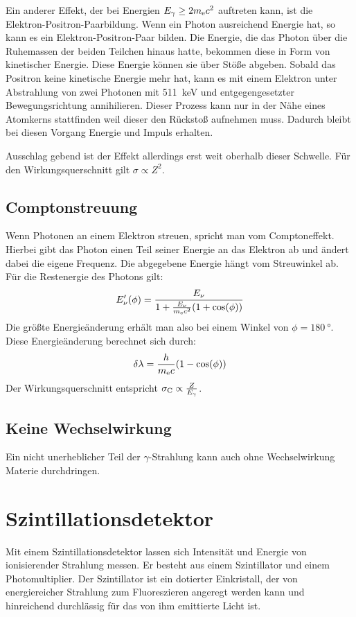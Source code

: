 \documentclass[11pt, ngerman, fleqn, DIV=15, headinclude, BCOR=2cm]{scrreprt}
\begin{document}
Ein anderer Effekt, der bei Energien $E_\gamma \ge 2m_\text ec^2$ auftreten
kann, ist die Elektron-Positron-Paarbildung. Wenn ein Photon ausreichend
Energie hat, so kann es ein Elektron-Positron-Paar bilden. Die Energie, die das
Photon über die Ruhemassen der beiden Teilchen hinaus hatte, bekommen diese in
Form von kinetischer Energie. Diese Energie können sie über Stöße abgeben.
Sobald das Positron keine kinetische Energie mehr hat, kann es mit einem
Elektron unter Abstrahlung von zwei Photonen mit \SI{511}{\kilo\electronvolt}
und entgegengesetzter Bewegungsrichtung annihilieren. Dieser Prozess kann nur in der Nähe eines Atomkerns stattfinden weil dieser
den Rückstoß aufnehmen muss.
Dadurch bleibt bei diesen Vorgang Energie und Impuls erhalten.

Ausschlag gebend ist der Effekt allerdings erst weit oberhalb dieser Schwelle.
Für den Wirkungsquerschnitt gilt $\sigma \propto Z^2$.

\subsection{Comptonstreuung}
Wenn Photonen an einem Elektron streuen, spricht man vom Comptoneffekt. 
Hierbei gibt das Photon einen Teil seiner Energie an das Elektron ab und ändert dabei
die eigene Frequenz.
Die abgegebene Energie hängt vom Streuwinkel ab.
Für die Restenergie des Photons gilt:
\[
    E_\nu'(\phi) = \frac{E_\nu}{1+\frac{E_\nu}{m_\text ec^2}(1+\cos(\phi))}
\]
Die größte Energieänderung erhält man also bei einem Winkel von
$\phi=\SI{180}{\degree}$.
Diese Energieänderung berechnet sich durch:
\[
    \delta\lambda = \frac{h}{m_\text ec}(1-\cos(\phi))
\]
Der Wirkungsquerschnitt entspricht $\sigma_\text C \propto \frac{Z}{E_\gamma}$.

\subsection{Keine Wechselwirkung}
Ein nicht unerheblicher Teil der $\gamma$-Strahlung kann auch ohne Wechselwirkung
Materie durchdringen.

\section{Szintillationsdetektor}

Mit einem Szintillationsdetektor lassen sich Intensität und Energie von
ionisierender Strahlung messen.
Er besteht aus einem Szintillator und einem Photomultiplier.
Der Szintillator ist ein dotierter Einkristall, der von energiereicher
Strahlung zum Fluoreszieren angeregt werden kann und hinreichend
durchlässig für das von ihm emittierte Licht ist.
\end{document}
